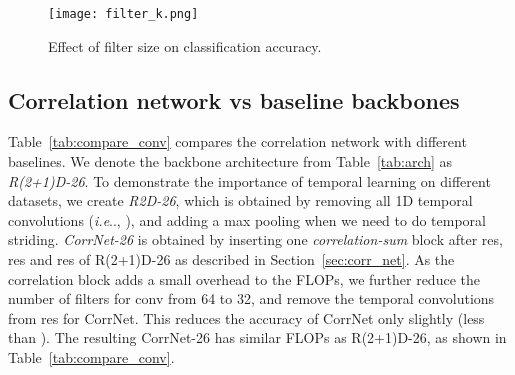 \documentclass[10pt,twocolumn,letterpaper]{article}
\makeatletter
\DeclareRobustCommand\onedot{\futurelet\@let@token\@onedot}
\def\@onedot{\ifx\@let@token.\else.\null\fi\xspace}
\def\ie{\emph{i.e}\onedot} \def\Ie{\emph{I.e}\onedot}
\makeatother
\begin{document}
\begin{table}[t]
\centering
{}
\caption{Correlation networks vs baselines. Our CorrNet significantly outperforms the two baseline architectures on three datasets, at a very small increase in FLOPs compared to R(2+1)D.
Using longer clip length  leads to better accuracy on all three datasets.} 
\label{tab:compare_conv}
\end{table}


\begin{figure}[t] 
\centering
\texttt{[image: filter\_k.png]}
   \caption{Effect of filter size  on classification accuracy.}
   \label{fig:comp_k}
\end{figure}

\subsection{Correlation network vs baseline backbones} \label{sec:compare_conv}



Table~\ref{tab:compare_conv} compares the correlation network with different baselines. We denote the backbone architecture from Table~\ref{tab:arch} as \textit{R(2+1)D-26}. To demonstrate the importance of temporal learning on different datasets, we create \textit{R2D-26}, which is obtained by removing all 1D temporal convolutions (\ie, ), and adding a  max pooling when we need to do temporal striding.
 \textit{CorrNet-26} is obtained by inserting one \textit{correlation-sum} block after res, res and res  of R(2+1)D-26 as described in Section~\ref{sec:corr_net}. As the correlation block adds a small overhead to the FLOPs, we further reduce the number of filters for conv from 64 to 32, and remove the  temporal convolutions from res for CorrNet. This reduces the accuracy of CorrNet only slightly (less than ). The resulting CorrNet-26 has similar FLOPs as R(2+1)D-26, as shown in Table~\ref{tab:compare_conv}.
\end{document}
